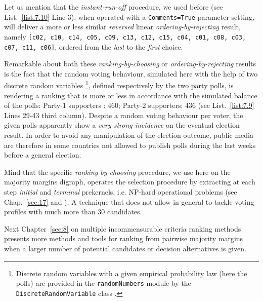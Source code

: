 Let us mention that the \emph{instant-run-off} procedure, we used before (see List.~\vref{list:7.10} Line 3), when operated with a \texttt{Comments=True} parameter setting, will deliver a more or less similar \emph{reversed} linear \emph{ordering-by-rejecting} result, namely \texttt{[c02, c10, c14, c05, c09, c13, c12, c15, c04, c01, c08, c03, c07, c11, c06]}, ordered from the \emph{last} to the \emph{first} choice.

Remarkable about both these \emph{ranking-by-choosing} or \emph{ordering-by-rejecting} results is the fact that the random voting behaviour, simulated here with the help of two discrete random variables \footnote{Discrete random variables with a given empirical probability law (here the polls) are provided in the \texttt{randomNumbers} module by the \texttt{DiscreteRandomVariable} class \citep{CPSTAT-L4}.}, defined respectively by the two party polls, is rendering a ranking that is more or less in accordance with the simulated balance of the polls: Party-1 supporters : 460;  Party-2 supporters: 436 (see List.~\vref{list:7.9} Lines 29-43 third column). Despite a random voting behaviour per voter, the given polls apparently show a \emph{very strong incidence} on the eventual election result. In order to avoid any manipulation of the election outcome, public media are therefore in some countries not allowed to publish polls during the last weeks before a general election.

Mind that the specific \emph{ranking-by-choosing} procedure, we use here on the majority margins digraph, operates the selection procedure by extracting at each step \emph{initial} and \emph{terminal} prekernels, i.e. NP-hard operational problems (see Chap.~\ref{sec:17} and \citealp{BIS-1999}); A technique that does not allow in general to tackle voting profiles with much more than 30 candidates.

\vspace{1cm}

Next Chapter~\ref{sec:8} on multiple incommensurable criteria ranking methods presents more methods and tools for ranking from pairwise majority margins when a larger number of potential candidates or decision alternatives is given.  

%


